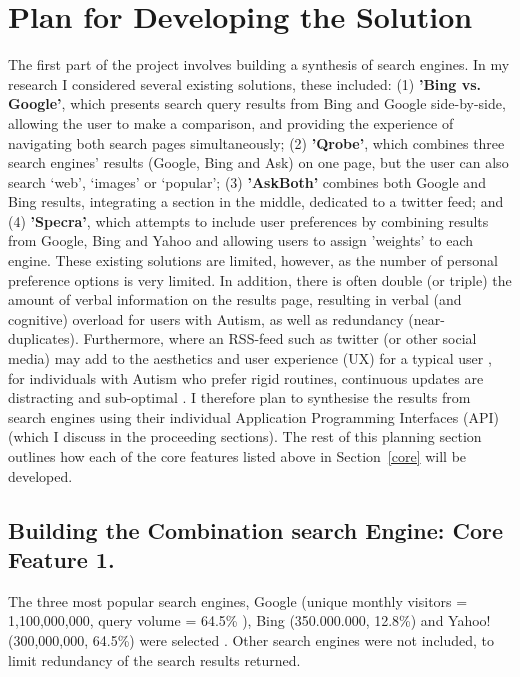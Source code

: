 \documentclass[a4paper, 10pt]{article}
\begin{document}
\section{Plan for Developing the Solution}\label{sol}
The first part of the project involves building a synthesis of search engines. In my research I considered several existing solutions, these included: (1) \textbf{'Bing vs. Google'}\cite{bingvsgoogle}, which presents search query results from Bing and Google side-by-side, allowing the user to make a comparison, and providing the experience of navigating both search pages simultaneously; (2) \textbf{'Qrobe'}\cite{qrobe}, which combines three search engines’ results (Google, Bing and Ask) on one page, but the user can also search ‘web’, ‘images’ or ‘popular’; (3) \textbf{'AskBoth'}\cite{askboth} combines both Google and Bing results, integrating a section in the middle, dedicated to a twitter feed; and (4) \textbf{'Specra'}\cite{specra}, which attempts to include user preferences by combining results from Google, Bing and Yahoo and allowing users to assign 'weights' to each engine. These existing solutions are limited, however, as the number of personal preference options is very limited. In addition, there is often double (or triple) the amount of verbal information on the results page, resulting in verbal (and cognitive) overload for users with Autism, as well as redundancy (near-duplicates). Furthermore, where an RSS-feed such as twitter (or other social media) may add to the aesthetics and user experience (UX) for a typical user \cite{social}, for individuals with Autism who prefer rigid routines, continuous updates are distracting and sub-optimal \cite{disengagement}. I therefore plan to synthesise the results from search engines using their individual Application Programming Interfaces (API) (which I discuss in the proceeding sections). The rest of this planning section outlines how each of the core features listed above in Section~\ref{core} will be developed.

\subsection{Building the Combination search Engine: Core Feature 1.} 
The three most popular search engines, Google (unique monthly visitors = 1,100,000,000, query volume = 64.5\% ), Bing (350.000.000, 12.8\%) and Yahoo! (300,000,000, 64.5\%) were selected \cite{ebiz, adam}. Other search engines were not included, to limit redundancy of the search results returned.
\end{document}
